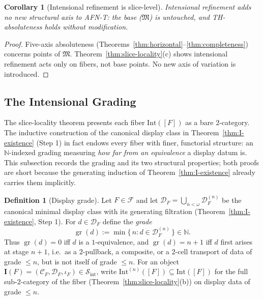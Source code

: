 \documentclass[11pt]{article}
\theoremstyle{plain}
\newtheorem{corollary}[theorem]{Corollary}
\theoremstyle{definition}
\newtheorem{definition}[theorem]{Definition}
\newcommand{\cS}{\mathcal{S}}
\newcommand{\cF}{\mathcal{F}}
\newcommand{\cC}{\mathcal{C}}
\newcommand{\cD}{\mathcal{D}}
\newcommand{\fM}{\mathfrak{M}}
\newcommand{\gr}{\operatorname{gr}}
\newcommand{\Sint}{\cS_{\mathrm{int}}}
\newcommand{\II}{\mathbf{I}}
\begin{document}
\begin{corollary}[Intensional refinement is slice-level]\label{cor:slice-level}
Intensional refinement adds no new structural axis to AFN-T: the base ($\fM$) is untouched, and TH-absoluteness holds without modification.
\end{corollary}

\begin{proof}
Five-axis absoluteness (Theorems~\ref{thm:horizontal}--\ref{thm:completeness}) concerns points of $\fM$. Theorem~\ref{thm:slice-locality}(c) shows intensional refinement acts only on fibers, not base points. No new axis of variation is introduced.
\end{proof}

\subsection{The Intensional Grading}\label{sec:intensional-grading}

The slice-locality theorem presents each fiber $\mathrm{Int}([F])$ as a bare $2$-category. The inductive construction of the canonical display class in Theorem~\ref{thm:I-existence} (Step 1) in fact endows every fiber with finer, functorial structure: an $\mathbb{N}$-indexed grading measuring \emph{how far from an equivalence} a display datum is. This subsection records the grading and its two structural properties; both proofs are short because the generating induction of Theorem~\ref{thm:I-existence} already carries them implicitly.

\begin{definition}[Display grade]\label{def:display-grade}
Let $F \in \cF$ and let $\cD_F = \bigcup_{n < \omega} \cD_F^{(n)}$ be the canonical minimal display class with its generating filtration (Theorem~\ref{thm:I-existence}, Step 1). For $d \in \cD_F$ define the \emph{grade}
\[ \gr(d) := \min\{\, n : d \in \cD_F^{(n)} \,\} \in \mathbb{N}. \]
Thus $\gr(d) = 0$ iff $d$ is a $1$-equivalence, and $\gr(d) = n+1$ iff $d$ first arises at stage $n+1$, i.e.\ as a $2$-pullback, a composite, or a $2$-cell transport of data of grade $\leq n$, but is not itself of grade $\leq n$. For an object $\II(F) = (\cC_F, \cD_F, \iota_F) \in \Sint$, write $\mathrm{Int}^{(n)}([F]) \subseteq \mathrm{Int}([F])$ for the full sub-$2$-category of the fiber (Theorem~\ref{thm:slice-locality}(b)) on display data of grade $\leq n$.
\end{definition}
\end{document}
